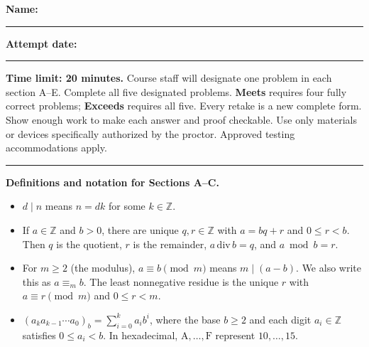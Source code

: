 \documentclass{article}
\newcommand{\equivmod}[1]{\mathrel{\equiv_{#1}}}
\begin{document}
\begin{tcolorbox}
\small
\textbf{Name:} \rule{2.35in}{0.4pt}\hfill
\textbf{Attempt date:} \rule{1.35in}{0.4pt}



\vspace{2pt}
\textbf{Time limit: 20 minutes.} Course staff will designate one problem in
each section A--E. Complete all five designated problems. \textbf{Meets}
requires four fully correct problems; \textbf{Exceeds} requires all five.
Every retake is a new complete form. Show enough work to make each answer and
proof checkable. Use only materials or devices specifically authorized by the
proctor. Approved testing accommodations apply.

\vspace{2pt}
\hrule
\vspace{2pt}
\textbf{Definitions and notation for Sections A--C.}
\begin{itemize}
  \item $d\mid n$ means $n=dk$ for some $k\in\mathbb Z$.
  \item If $a\in\mathbb Z$ and $b>0$, there are unique $q,r\in\mathbb Z$
        with $a=bq+r$ and $0\le r<b$. Then
        $q$ is the quotient, $r$ is the remainder,
        $a\,\mathrm{div}\,b=q$, and $a\bmod b=r$.
  \item For $m\ge2$ (the modulus), $a\equiv b\pmod m$ means
        $m\mid(a-b)$. We also write this as $a\equivmod{m}b$. The least
        nonnegative residue is the unique $r$ with $a\equiv r\pmod m$ and
        $0\le r<m$.
  \item $(a_ka_{k-1}\cdots a_0)_b=\sum_{i=0}^{k}a_i b^i$, where
        the base $b\ge2$ and each digit $a_i\in\mathbb Z$ satisfies
        $0\le a_i<b$. In hexadecimal, $\mathrm A,\ldots,\mathrm F$
        represent $10,\ldots,15$.
\end{itemize}
\end{tcolorbox}
\end{document}
